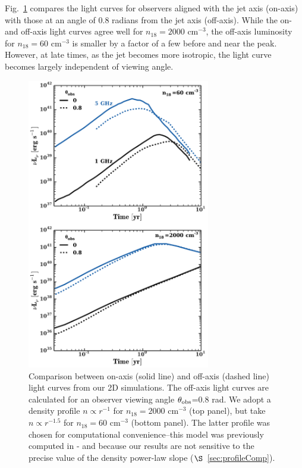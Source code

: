 \documentclass[usenatbib,fleqn]{mnras}
\begin{document}
Fig.~\ref{fig:onOff} compares the light curves for observers aligned
with the jet axis (on-axis) with those at an angle of 0.8 radians from
the jet axis (off-axis).  While the on- and off-axis light curves agree well for $n_{18}=2000$ cm$^{-3}$, the off-axis luminosity for $n_{18}=60$ cm$^{-3}$ is smaller by a factor of a few before and near the
peak.  However, at late times, as the jet becomes more isotropic, the light curve becomes largely independent of viewing angle.

\begin{figure}
\includegraphics[width=8cm]{on_off.pdf}
\caption{\label{fig:onOff} Comparison between on-axis (solid line) and off-axis (dashed line)
  light curves from our 2D simulations.  The off-axis light curves are calculated for an observer viewing angle $\theta_{\rm obs}$=0.8 rad.  We adopt a density profile $n\propto r^{-1}$ for $n_{18}=2000$ cm$^{-3}$ (top panel), but take $n\propto r^{-1.5}$ for $n_{18}=60$ cm$^{-3}$ (bottom panel).  The latter profile was chosen for computational
  convenience--this model was previously computed in \citet{Mimica+2015} - and because our results are not sensitive to the precise value of the density power-law slope ($\S$~\ref{sec:profileComp}).}
\end{figure}
\end{document}
